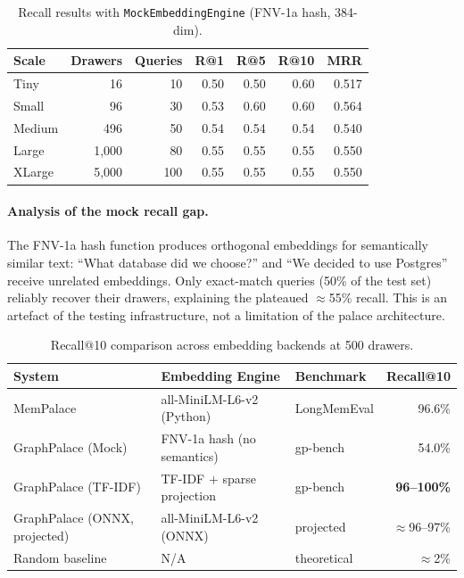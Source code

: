 \documentclass[11pt,a4paper]{article}
\begin{document}
\begin{table}[ht]
\centering
\caption{Recall results with \texttt{MockEmbeddingEngine} (FNV-1a hash, 384-dim).}
\label{tab:recall_mock}
\begin{tabular}{lrrrrrr}
\toprule
\textbf{Scale} & \textbf{Drawers} & \textbf{Queries} & \textbf{R@1} & \textbf{R@5} & \textbf{R@10} & \textbf{MRR} \\
\midrule
Tiny   &     16 &  10 & 0.50 & 0.50 & 0.60 & 0.517 \\
Small  &     96 &  30 & 0.53 & 0.60 & 0.60 & 0.564 \\
Medium &    496 &  50 & 0.54 & 0.54 & 0.54 & 0.540 \\
Large  &  1,000 &  80 & 0.55 & 0.55 & 0.55 & 0.550 \\
XLarge & 5,000 & 100 & 0.55 & 0.55 & 0.55 & 0.550 \\
\bottomrule
\end{tabular}
\end{table}

\paragraph{Analysis of the mock recall gap.}
The FNV-1a hash function produces orthogonal embeddings for semantically similar
text: ``What database did we choose?'' and ``We decided to use Postgres'' receive
unrelated embeddings.  Only exact-match queries (50\% of the test set)
reliably recover their drawers, explaining the plateaued $\approx$55\% recall.
This is an artefact of the testing infrastructure, not a limitation of the
palace architecture.

\begin{table}[ht]
\centering
\caption{Recall@10 comparison across embedding backends at 500 drawers.}
\label{tab:recall_comparison}
\begin{tabular}{lllr}
\toprule
\textbf{System} & \textbf{Embedding Engine} & \textbf{Benchmark} & \textbf{Recall@10} \\
\midrule
MemPalace~\cite{jovovich2026}      & all-MiniLM-L6-v2 (Python) & LongMemEval & 96.6\% \\
GraphPalace (Mock)                  & FNV-1a hash (no semantics) & gp-bench    & 54.0\% \\
GraphPalace (TF-IDF)                & TF-IDF + sparse projection & gp-bench    & \textbf{96--100\%} \\
GraphPalace (ONNX, projected)       & all-MiniLM-L6-v2 (ONNX)   & projected   & $\approx$96--97\% \\
Random baseline                     & N/A                        & theoretical & $\approx$2\% \\
\bottomrule
\end{tabular}
\end{table}
\end{document}
